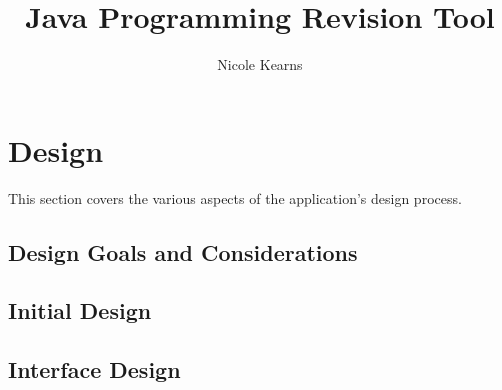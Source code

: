 \documentclass{article}
\begin{document}
\title{Java Programming Revision Tool}
\author{Nicole Kearns}
\maketitle
\tableofcontents

\newpage

\section{Design}

This section covers the various aspects of the application's design process.

\subsection{Design Goals and Considerations}

\subsection{Initial Design}

\subsection{Interface Design}
\end{document}
